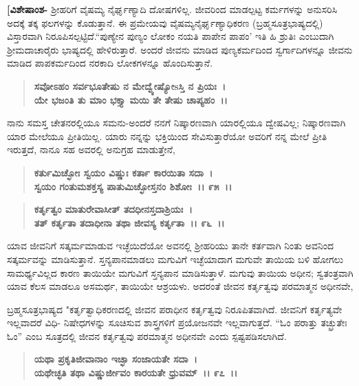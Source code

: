 \textbf{[ವಿಶೇಷಾಂಶ-} ಶ‍್ರೀಹರಿಗೆ ವೈಷಮ್ಯ ನೈರ್ಘೃಣ್ಯಾದಿ ದೋಷಗಳಿಲ್ಲ. ಜೀವರಿಂದ ಮಾಡಲ್ಪಟ್ಟ ಕರ್ಮಗಳನ್ನು ಅನುಸರಿಸಿ ಅದಕ್ಕೆ ತಕ್ಕ ಫಲಗಳನ್ನು ಕೊಡುತ್ತಾನೆ. ಈ ಪ್ರಮೇಯವು ವೈಷಮ್ಯನೈರ್ಘೃಣ್ಯಾಧಿಕರಣ (ಬ್ರಹ್ಮಸೂತ್ರಭಾಷ್ಯದಲ್ಲಿ) ವಿಸ್ತಾರವಾಗಿ ನಿರೂಪಿಸಲ್ಪಟ್ಟಿದೆ.\break “ಪುಣ್ಯೇನ ಪುಣ್ಯಂ ಲೋಕಂ ನಯತಿ ಪಾಪೇನ ಪಾಪಂ' ಇತಿ ಹಿ ಶ್ರುತಿಃ ಎಂಬುದಾಗಿ ಶ‍್ರೀಮದಾಚಾರೈರು ಭಾಷ್ಯದಲ್ಲಿ ಹೇಳಿರುತ್ತಾರೆ. ಅಂದರೆ ಜೀವನು ಮಾಡಿದ ಪುಣ್ಯಕರ್ಮದಿಂದ ಸ್ವರ್ಗಾದಿಗಳನ್ನೂ ಜೀವನು ಮಾಡಿದ ಪಾಪಕರ್ಮದಿಂದ ನರಕಾದಿ ಲೋಕಗಳನ್ನೂ ಹೊಂದಿಸುತ್ತಾನೆ.

\begin{verse}
\textbf{ಸವೋಽಹಂ ಸರ್ವಭೂತೇಷು ನ ಮೇದ್ವ್ಯೇಷ್ಯೋsಸ್ತಿ ನ ಪ್ರಿಯಃ~।}\\\textbf{ಯೇ ಭಜಂತಿ ತು ಮಾಂ ಭಕ್ತ್ಯಾ ಮಯಿ ತೇ ತೇಷು ಚಾಪ್ಯಹಂ~।।} 
\end{verse}

ನಾನು ಸಮಸ್ತ ಚೇತನರಲ್ಲಿಯೂ ಸಮನು-ಅಂದರೆ ನನಗೆ ನಿಷ್ಕಾರಣವಾಗಿ ಯಾರಲ್ಲಿಯೂ ದ್ವೇಷವಿಲ್ಲ; ನಿಷ್ಕಾರಣವಾಗಿ ಯಾರ ಮೇಲೆಯೂ ಪ್ರೀತಿಯಿಲ್ಲ. ಯಾರು ನನ್ನನ್ನು ಭಕ್ತಿಯಿಂದ ಸೇವಿಸುತ್ತಾರೆಯೋ ಅವರಿಗೆ ನನ್ನ ಮೇಲೆ ಪ್ರೀತಿ ಇರುತ್ತದೆ, ನಾನೂ ಸಹ ಅವರಲ್ಲಿ ಅನುಗ್ರಹ ಮಾಡುತ್ತೇನೆ,

\begin{verse}
\textbf{ಕರ್ತುಮಿಚ್ಛೋಃ ಸ್ವಯಂ ವಿಷ್ಣುಃ ಕರ್ತಾ ಕಾರಯಿತಾ ಸದಾ~।}\\\textbf{ಸ್ವಯಂ ಗಂತುಮಶಕ್ತಸ್ಯ ಪಾತುಮಿಚ್ಛೋಸ್ತನಂ ಶಿಶೋಃ~।। ೯೫~।।} 
\end{verse}

\begin{verse}
\textbf{ಕರ್ತೃತ್ವಂ ಮಾತುರೇವಾಸೀತ್ ತದಧೀನಸ್ತದಾಶ್ರಿಯಃ~।}\\\textbf{ತತ್ ಕರ್ತೃತಾ ತದಾಧೀನಾ ತಥಾ ಜೀವಸ್ಯ ಕರ್ತೃತಾ~।। ೯೬~।।}
\end{verse}

ಯಾವ ಜೀವನಿಗೆ ಸತ್ಕರ್ಮಮಾಡುವ ಇಚ್ಛೆಯಿದೆಯೋ ಅವನಲ್ಲಿ ಶ‍್ರೀಹರಿಯು ತಾನೇ ಕರ್ತವಾಗಿ ನಿಂತು ಅವನಿಂದ ಸತ್ಕರ್ಮವನ್ನು ಮಾಡಿಸುತ್ತಾನೆ. ಸ್ತನ್ಯಪಾನಮಾಡಲು ಮಗುವಿಗೆ ಇಚ್ಛೆಯಾದಾಗ ಮಗುವೇ ತಾಯಿಯ ಬಳಿ ಹೋಗಲು ಸಾಮರ್ಥ್ಯವಿಲ್ಲದ ಕಾರಣ ತಾಯಿಯೇ ಮಗುವಿಗೆ ಸ್ತನ್ಯಪಾನ ಮಾಡಿಸುತ್ತಾಳೆ. ಮಗುವು ತಾಯಿಯ ಅಧೀನ; ಸ್ವತಂತ್ರವಾಗಿ ಯಾವ ಕೆಲಸ ಮಾಡಲೂ ಅಸಮರ್ಥ, ತಾಯಿಯೇ ಆಶ್ರಯಳು. ಅದರಂತೆ ಜೀವನ ಕರ್ತೃತ್ವವು ಪರಮಾತ್ಮನ ಅಧೀನವೇ,

ಬ್ರಹ್ಮಸೂತ್ರಭಾಷ್ಯದ "ಕರ್ತೃತ್ವಾಧಿಕರಣದಲ್ಲಿ ಜೀವನ ಪರಾಧೀನ ಕರ್ತೃತ್ವವು ನಿರೂಪಿತವಾಗಿದೆ. ಜೀವನಿಗೆ ಕರ್ತೃತ್ಯವೇ ಇಲ್ಲವಾದರೆ ವಿಧಿ- ನಿಷೇಧಗಳನ್ನು ಸೂಚಿಸುವ ಶಾಸ್ತ್ರಗಳಿಗೆ ಪ್ರಯೋಜನವೇ ಇಲ್ಲವಾಗುತ್ತದೆ. “ಓಂ ಪರಾತ್ತು ತಚ್ಛ್ರುತೇಃ ಓಂ” ಎಂಬ ಸೂತ್ರದಲ್ಲಿ ಜೀವನ ಕರ್ತೃತ್ವವು ಪರಮಾತ್ಮನ ಅಧೀನವೇ ಎಂದು ಸ್ಪಷ್ಟಪಡಿಸಲಾಗಿದೆ.

\begin{verse}
\textbf{ಯಥಾ ಪ್ರಕೃತಿಜೀವಾನಾಂ ಇಚ್ಛಾ ಸಂಜಾಯತೇ ಸದಾ~।}\\\textbf{ಯಥೇಚ್ಛತಿ ತಥಾ ವಿಷ್ಣುರ್ಜೀವಂ ಕಾರಯತೇ ಧ್ರುವಮ್~।। ೯೭~।।}
\end{verse}

